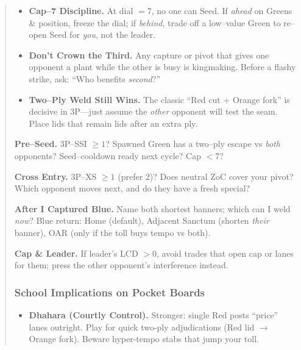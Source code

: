 \documentclass[11pt]{article}
\begin{document}
\begin{quote}
\begin{itemize}[leftmargin=1.3em,itemsep=0.35em]
  \item \textbf{Cap–7 Discipline.} At dial $=7$, no one can Seed. If \emph{ahead} on Greens \& position, freeze the dial; if \emph{behind}, trade off a low–value Green to re–open Seed for \emph{you}, not the leader.

  \item \textbf{Don’t Crown the Third.} Any capture or pivot that gives one opponent a plant while the other is busy is kingmaking. Before a flashy strike, ask: “Who benefits \emph{second}?”

  \item \textbf{Two–Ply Weld Still Wins.} The classic “Red cut + Orange fork” is decisive in 3P—just assume the \emph{other} opponent will test the seam. Place lids that remain lids after an extra ply.

\end{itemize}

\medskip
\begin{tcolorbox}[enhanced,breakable,title={Triad Checklists (Say it before you move)},
  colback=white,colframe=royal,boxrule=0.8pt]
\small
\textbf{Pre–Seed.} 3P–SSI $\ge 1$? Spawned Green has a two–ply escape vs \emph{both} opponents? Seed–cooldown ready next cycle? Cap $<7$?

\textbf{Cross Entry.} 3P–XS $\ge 1$ (prefer 2)? Does neutral ZoC cover your pivot? Which opponent moves next, and do they have a fresh special?

\textbf{After I Captured Blue.} Name both shortest banners; which can I weld \emph{now}? Blue return: Home (default), Adjacent Sanctum (shorten \emph{their} banner), OAR (only if the toll buys tempo vs both).

\textbf{Cap \& Leader.} If leader’s LCD $>0$, avoid trades that open cap or lanes for them; press the other opponent’s interference instead.
\end{tcolorbox}

\subsubsection*{School Implications on Pocket Boards}
\label{sec:pocket-implications}

\begin{tcolorbox}[enhanced,breakable,title={4$\times$4 Pocket Diamond — What Changes},
  colback=white,colframe=royal,boxrule=0.8pt]
\small
\begin{itemize}[leftmargin=1.1em,itemsep=0.3em]

\item \textbf{Dhahara (Courtly Control).} Stronger: single Red posts “price” lanes outright. Play for quick two-ply adjudications (Red lid $\rightarrow$ Orange fork). Beware hyper-tempo stabs that jump your toll.


\end{itemize}
\end{tcolorbox}
\end{quote}
\end{document}
